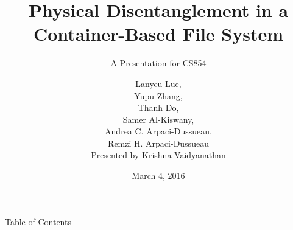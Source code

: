 \documentclass[aspectratio=169]{beamer}
\title[IceFS]{Physical Disentanglement in a Container-Based File System}
\subtitle{A Presentation for CS854}
\author[Presented by Krishna Vaidyanathan]{Lanyeu Lue,\\Yupu Zhang,\\Thanh
    Do,\\Samer Al-Kiswany,\\Andrea C. Arpaci-Dussueau,\\Remzi
    H. Arpaci-Dussueau\\\vspace{2em}Presented by Krishna Vaidyanathan}
\date{March 4, 2016}
\begin{document}
\frame[plain]{\titlepage}

\begin{frame}{Table of Contents}
\tableofcontents
\end{frame}
\end{document}
